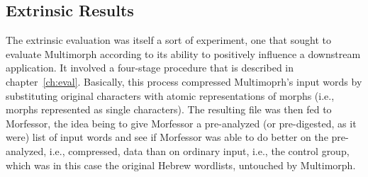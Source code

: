 {%

\subsection{Extrinsic Results}

The extrinsic evaluation was itself a sort of experiment, one that sought to evaluate Multimorph according to its 
ability to positively influence a downstream application. It involved a four-stage procedure that is described in 
chapter~\ref{ch:eval}. 
Basically, this process compressed Multimoprh's input words by substituting original characters with atomic 
representations of morphs (i.e., morphs represented as single characters). The resulting file was then fed to 
Morfessor, the idea being to give Morfessor a pre-analyzed (or pre-digested, as it were) list of input words and
 see if Morfessor was able to do better on the pre-analyzed, i.e., compressed, data than on ordinary input, i.e., 
 the control group, which was in this case the original Hebrew wordlists, untouched by Multimorph.
%

}
